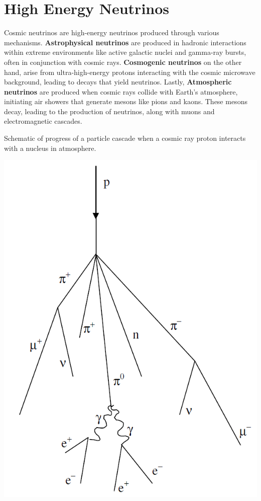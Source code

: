 \section{High Energy Neutrinos}
\label{sec:cosmic_nu}
Cosmic neutrinos are high-energy neutrinos produced through various mechanisms. \textbf{Astrophysical neutrinos} are produced in hadronic interactions within extreme environments like active galactic nuclei and gamma-ray bursts, often in conjunction with cosmic rays. \textbf{Cosmogenic neutrinos} on the other hand, arise from ultra-high-energy protons interacting with the cosmic microwave background, leading to decays that yield neutrinos. Lastly, \textbf{Atmospheric neutrinos} are produced when cosmic rays collide with Earth's atmosphere, initiating air showers that generate mesons like pions and kaons. These mesons decay, leading to the production of neutrinos, along with muons and electromagnetic cascades. 
\begin{marginfigure}
    \caption{Schematic of progress of a particle cascade when a cosmic ray proton interacts with a nucleus in atmosphere.}
    \includegraphics{./figures/nu_he/An-illustration-of-the-Shower-of-Particles-Produced-by-Cosmic-Ray-Collisions-From-Coan.png}
\end{marginfigure}
